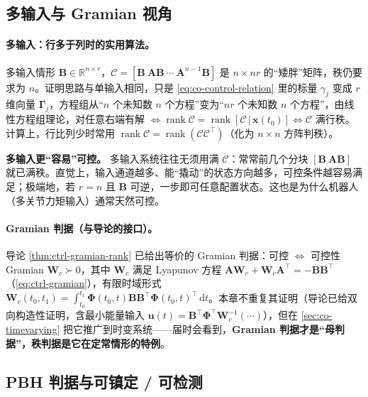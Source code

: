 \subsection{多输入与 Gramian 视角}
\label{sec:co-rank-multi}

\paragraph{多输入：行多于列时的实用算法。}
多输入情形 $\mathbf{B}\in\mathbb{R}^{n\times r}$，$\mathcal{C}=[\mathbf{B}\ \mathbf{A}\mathbf{B}\ \cdots\ \mathbf{A}^{n-1}\mathbf{B}]$ 是 $n\times nr$ 的“矮胖”矩阵，秩仍要求为 $n$。证明思路与单输入相同，只是 \cref{eq:co-control-relation} 里的标量 $\gamma_j$ 变成 $r$ 维向量 $\boldsymbol{\Gamma}_j$，方程组从“$n$ 个未知数 $n$ 个方程”变为“$nr$ 个未知数 $n$ 个方程”，由线性方程组理论，对任意右端有解 $\iff \operatorname{rank}\mathcal{C}=\operatorname{rank}[\mathcal{C}\,|\,\mathbf{x}(t_0)]\iff\mathcal{C}$ 满行秩\cite{liubao2006modern}。计算上，行比列少时常用 $\operatorname{rank}\mathcal{C}=\operatorname{rank}(\mathcal{C}\mathcal{C}^\top)$（化为 $n\times n$ 方阵判秩）。

\begin{note}
\textbf{多输入更“容易”可控。}\;
多输入系统往往无须用满 $\mathcal{C}$：常常前几个分块 $[\mathbf{B}\ \mathbf{A}\mathbf{B}]$ 就已满秩。直觉上，输入通道越多、能“撬动”的状态方向越多，可控条件越容易满足；极端地，若 $r=n$ 且 $\mathbf{B}$ 可逆，一步即可任意配置状态\cite{liubao2006modern}。这也是为什么机器人（多关节力矩输入）通常天然可控。
\end{note}

\paragraph{Gramian 判据（与导论的接口）。}
导论 \cref{thm:ctrl-gramian-rank} 已给出等价的 Gramian 判据：可控 $\iff$ 可控性 Gramian $\mathbf{W}_c\succ0$，其中 $\mathbf{W}_c$ 满足 Lyapunov 方程 $\mathbf{A}\mathbf{W}_c+\mathbf{W}_c\mathbf{A}^\top=-\mathbf{B}\mathbf{B}^\top$（\cref{eq:ctrl-gramian}），有限时域形式 $\mathbf{W}_c(t_0,t_1)=\int_{t_0}^{t_1}\boldsymbol{\Phi}(t_0,t)\mathbf{B}\mathbf{B}^\top\boldsymbol{\Phi}(t_0,t)^\top\,\mathrm dt$。本章不重复其证明（导论已给双向构造性证明，含最小能量输入 $\mathbf{u}(t)=\mathbf{B}^\top\boldsymbol{\Phi}^\top\mathbf{W}_c^{-1}(\cdots)$），但在 \cref{sec:co-timevarying} 把它推广到时变系统——届时会看到，\textbf{Gramian 判据才是“母判据”，秩判据是它在定常情形的特例}。

\subsection{PBH 判据与可镇定 / 可检测}
\label{sec:co-stabilizable}

